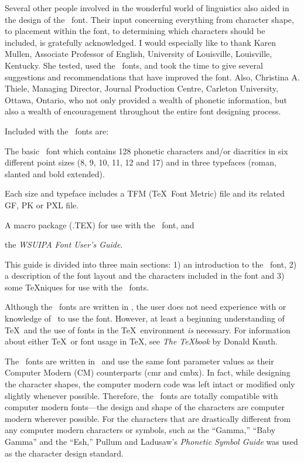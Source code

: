 Several other people involved
in the wonderful world of linguistics also aided in the design of the \wsu\
font. Their input concerning everything
from character shape, to placement within the font, to determining which
characters should be included, is gratefully acknowledged. I would especially
like to thank Karen Mullen, Associate Professor of English, University of
Louisville, Louisville, Kentucky.  She tested, used the \wsu\ fonts, and took
the time to give several suggestions and recommendations that have improved
the font. Also, Christina A. Thiele, Managing Director, Journal Production
 Centre,
Carleton University, Ottawa, Ontario, who not only provided a wealth
of phonetic information, but also a wealth of encouragement throughout
the entire font designing process.
 
 
Included with the \wsu\ fonts are:
 
\listbegin
{}
The basic \wsu\ font which contains 128 phonetic characters
and/or diacritics in six different point sizes (8,
9, 10, 11, 12 and 17) and in
three typefaces (roman, slanted and bold extended).
 
 Each size and typeface includes a TFM (\TeX\ Font Metric)
file and its related GF, PK or PXL file.
 
 A macro package (\ipam.TEX) for use with the \wsu\ font, and
 
 the {\it WSUIPA Font User's Guide}.
\listend
 
This guide is divided into three main sections: 1) an introduction to the \wsu\
font,
2) a description of the font layout and the characters included in the font
and 3) some \TeX niques for use with the \wsu\  fonts.
 
Although the \wsu\ fonts are written in \meta , the user does not need
experience with or knowledge of \meta\ to use the font. However, at least a
beginning understanding of \TeX\ and the use of fonts in the \TeX\ environment
{\it is} necessary. For information about either \TeX\ or font usage in \TeX ,
see {\it The \TeX book} by Donald Knuth.
 
 
The \wsu\  fonts are written in \meta\ and use the same font parameter values
as their Computer Modern (CM) counterparts (cmr and cmbx). In fact, while
designing the character shapes, the computer modern code was left intact or
modified only slightly whenever possible. Therefore, the \wsu\  fonts
are totally compatible with computer modern fonts---the design and shape
of the characters are computer modern wherever possible. For the characters
that are drastically different from any computer modern characters or symbols,
such as the ``Gamma,'' ``Baby Gamma'' and the ``Esh,'' Pullum and Ladusaw's
{\it Phonetic Symbol Guide} was used as the character design
standard.
 
